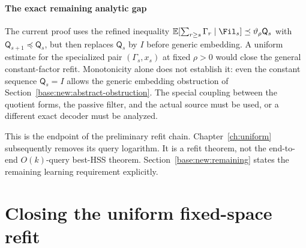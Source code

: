 \documentclass[11pt,oneside,openany,a4paper]{book}
\numberwithin{equation}{chapter}
\theoremstyle{definition}
\theoremstyle{remark}
\newcommand{\R}{\mathbb R}\newcommand{\E}{\mathbb E}\newcommand{\Prb}{\mathbb P}\newcommand{\PP}{\mathbb P}
\newcommand{\F}[1]{\left\lVert#1\right\rVert_F}
\newcommand{\op}[1]{\left\lVert#1\right\rVert_{\rm op}}
\DeclareMathOperator{\tr}{tr}\DeclareMathOperator{\rank}{rank}
\begin{document}
\subsection{The exact remaining analytic gap}
The current proof uses the refined inequality
$\E[\sum_{r\ge s}\Gamma_r\mid\Fil_s]\preceq\vartheta_\rho\mathsf Q_s$
with $\mathsf Q_{s+1}\preceq\mathsf Q_s$, but then replaces $\mathsf Q_s$ by $I$ before generic embedding. A uniform estimate for the specialized pair $(\Gamma_s,x_s)$ at fixed $\rho>0$ would close the general constant-factor refit. Monotonicity alone does not establish it: even the constant sequence $\mathsf Q_s=I$ allows the generic embedding obstruction of Section~\ref{base:new:abstract-obstruction}. The special coupling between the quotient forms, the passive filter, and the actual source must be used, or a different exact decoder must be analyzed.

This is the endpoint of the preliminary refit chain. Chapter~\ref{ch:uniform} subsequently removes its query logarithm. It is a refit theorem, not the end-to-end $O(k)$-query best-HSS theorem. Section~\ref{base:new:remaining} states the remaining learning requirement explicitly.



\endgroup

\part{Closing the uniform fixed-space refit}

\begingroup
\let\E\relax
\newcommand{\E}{\mathbb E}
\let\R\relax
\newcommand{\R}{\mathbb R}
\let\F\relax
\newcommand{\F}[1]{\lVert#1\rVert_F}
\let\op\relax
\newcommand{\op}[1]{\lVert#1\rVert_{\mathrm{op}}}
\let\tr\relax
\newcommand{\tr}{\operatorname{tr}}
\end{document}

